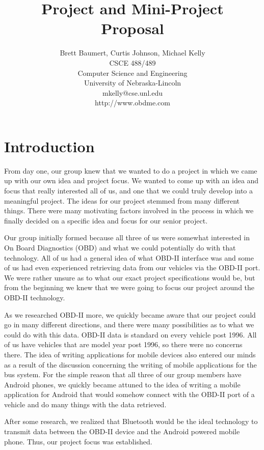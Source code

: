 \documentclass[12pt]{article}
\title{\bf Project and Mini-Project  \\ 
Proposal}
\author{Brett Baumert, Curtis Johnson, Michael Kelly \\
CSCE 488/489 \\
Computer Science and Engineering\\
University of Nebraska-Lincoln\\
mkelly@cse.unl.edu \\
http://www.obdme.com \\
}
\newcommand{\doublespace}{\baselineskip0.34truein}
\begin{document}
\maketitle


\section{Introduction}\label{sec:Introduction}

From day one, our group knew that we wanted to do a project in which we came up with our own idea and project focus. We wanted to come up with an idea and focus that really interested all of us, and one that we could truly develop into a meaningful project.  The ideas for our project stemmed from many different things. There were many motivating factors involved in the process in which we finally decided on a specific idea and focus for our senior project.

Our group initially formed because all three of us were somewhat interested in On Board Diagnostics (OBD) and what we could potentially do with that technology. All of us had a general idea of what OBD-II interface was and some of us had even experienced retrieving data from our vehicles via the OBD-II port. We were rather unsure as to what our exact project specifications would be, but from the beginning we knew that we were going to focus our project around the OBD-II technology.

As we researched OBD-II more, we quickly became aware that our project could go in many different directions, and there were many possibilities as to what we could do with this data. OBD-II data is standard on every vehicle post 1996. All of us have vehicles that are model year post 1996, so there were no concerns there. The idea of writing applications for mobile devices also entered our minds as a result of the discussion concerning the writing of mobile applications for the bus system. For the simple reason that all three of our group members have Android phones, we quickly became attuned to the idea of writing a mobile application for Android that would somehow connect with the OBD-II port of a vehicle and do many things with the data retrieved.

After some research, we realized that Bluetooth would be the ideal technology to transmit data between the OBD-II device and the Android powered mobile phone. Thus, our project focus was established.
\end{document}
